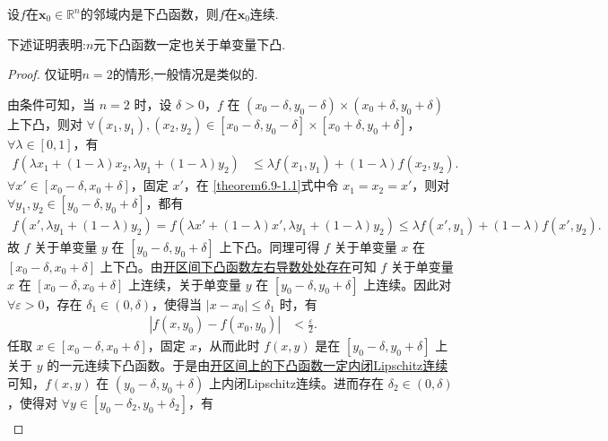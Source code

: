 \documentclass[../../main.tex]{subfiles}%
\begin{document}
\begin{theorem}\label{theorem:邻域上下凸的函数一定在这点连续}
设\(f\)在\(\mathbf{x}_0\in\mathbb{R}^n\)的邻域内是下凸函数，则\(f\)在\(\mathbf{x}_0\)连续.
\end{theorem}
\begin{note}
下述证明表明:$n$元下凸函数一定也关于单变量下凸.
\end{note}
\begin{proof}
仅证明$n=2$的情形,一般情况是类似的.

由条件可知，当 \(n = 2\) 时，设 \(\delta>0\)，\(f\) 在 \((x_0 - \delta, y_0 - \delta)\times(x_0 + \delta, y_0 + \delta)\) 上下凸，则对 \(\forall (x_1,y_1),(x_2,y_2)\in [x_0 - \delta, y_0 - \delta]\times[x_0 + \delta, y_0 + \delta]\)，\(\forall \lambda\in[0,1]\)，有
\begin{align}
f(\lambda x_1 + (1 - \lambda)x_2,\lambda y_1 + (1 - \lambda)y_2) &\leqslant \lambda f(x_1,y_1)+(1 - \lambda)f(x_2,y_2). \label{theorem6.9-1.1}
\end{align}
\(\forall x'\in [x_0 - \delta, x_0 + \delta]\)，固定 \(x'\)，在 \eqref{theorem6.9-1.1}式中令 \(x_1 = x_2 = x'\)，则对 \(\forall y_1,y_2\in [y_0 - \delta, y_0 + \delta]\)，都有
\begin{align*}
f(x',\lambda y_1 + (1 - \lambda)y_2) = f(\lambda x' + (1 - \lambda)x',\lambda y_1 + (1 - \lambda)y_2) 
\leqslant \lambda f(x',y_1)+(1 - \lambda)f(x',y_2).
\end{align*}
故 \(f\) 关于单变量 \(y\) 在 \([y_0 - \delta, y_0 + \delta]\) 上下凸。同理可得 \(f\) 关于单变量 \(x\) 在 \([x_0 - \delta, x_0 + \delta]\) 上下凸。由\hyperref[theorem:开区间下凸函数左右导数处处存在]{开区间下凸函数左右导数处处存在}可知 \(f\) 关于单变量 \(x\) 在 \([x_0 - \delta, x_0 + \delta]\) 上连续，关于单变量 \(y\) 在 \([y_0 - \delta, y_0 + \delta]\) 上连续。因此对 \(\forall \varepsilon>0\)，存在 \(\delta_1\in(0,\delta)\)，使得当 \(|x - x_0|\leqslant\delta_1\) 时，有
\begin{align}
|f(x,y_0) - f(x_0,y_0)| &< \frac{\varepsilon}{2}. \label{theorem6.9-2.1}
\end{align}
任取 \(x\in [x_0 - \delta, x_0 + \delta]\)，固定 \(x\)，从而此时 \(f(x,y)\) 是在 \([y_0 - \delta, y_0 + \delta]\) 上关于 \(y\) 的一元连续下凸函数。于是由\hyperref[theorem:开区间上的下凸函数一定内闭Lipschitz连续]{开区间上的下凸函数一定内闭Lipschitz连续}可知，\(f(x,y)\) 在 \((y_0 - \delta, y_0 + \delta)\) 上内闭Lipschitz连续。进而存在 \(\delta_2\in(0,\delta)\)，使得对 \(\forall y\in [y_0 - \delta_2, y_0 + \delta_2]\)，有
\begin{align}

\end{align}
\end{proof}
\end{document}
